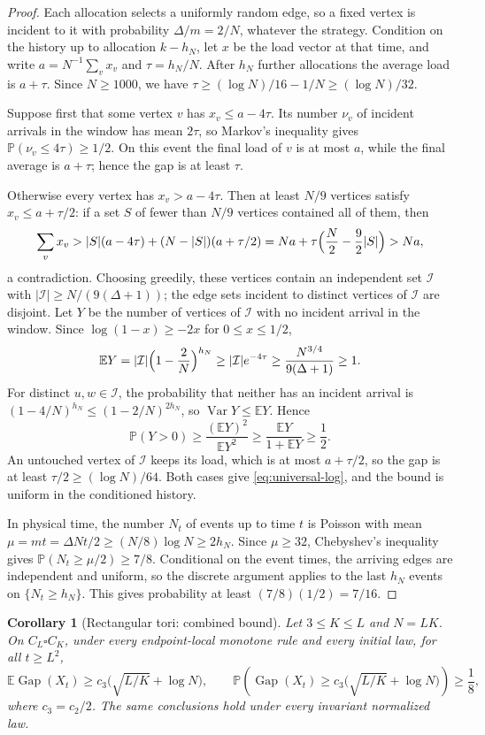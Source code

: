 \documentclass[11pt]{article}
\newtheorem{corollary}[corollary]{Corollary}
\theoremstyle{remark}
\newcommand{\E}{\mathbb{E}}
\newcommand{\Pp}{\mathbb{P}}
\newcommand{\Gap}{\operatorname{Gap}}
\newcommand{\Var}{\operatorname{Var}}
\begin{document}
\begin{proof}
Each allocation selects a uniformly random edge, so a fixed vertex is incident to it with probability $\Delta/m=2/N$, whatever the strategy. Condition on the history up to allocation $k-h_N$, let $x$ be the load vector at that time, and write $a=N^{-1}\sum_vx_v$ and $\tau=h_N/N$. After $h_N$ further allocations the average load is $a+\tau$. Since $N\ge1000$, we have $\tau\ge(\log N)/16-1/N\ge(\log N)/32$.

Suppose first that some vertex $v$ has $x_v\le a-4\tau$. Its number $\nu_v$ of incident arrivals in the window has mean $2\tau$, so Markov's inequality gives $\Pp(\nu_v\le4\tau)\ge1/2$. On this event the final load of $v$ is at most $a$, while the final average is $a+\tau$; hence the gap is at least $\tau$.

Otherwise every vertex has $x_v>a-4\tau$. Then at least $N/9$ vertices satisfy $x_v\le a+\tau/2$: if a set $S$ of fewer than $N/9$ vertices contained all of them, then
\[
 \sum_vx_v>|S|(a-4\tau)+(N-|S|)(a+\tau/2)=Na+\tau\Bigl(\frac N2-\frac92|S|\Bigr)>Na,
\]
a contradiction. Choosing greedily, these vertices contain an independent set $\mathcal I$ with $|\mathcal I|\ge N/(9(\Delta+1))$; the edge sets incident to distinct vertices of $\mathcal I$ are disjoint. Let $Y$ be the number of vertices of $\mathcal I$ with no incident arrival in the window. Since $\log(1-x)\ge-2x$ for $0\le x\le1/2$,
\[
 \E Y=|\mathcal I|\Bigl(1-\frac2N\Bigr)^{h_N}\ge |\mathcal I|e^{-4\tau}\ge\frac{N^{3/4}}{9(\Delta+1)}\ge1.
\]
For distinct $u,w\in\mathcal I$, the probability that neither has an incident arrival is $(1-4/N)^{h_N}\le(1-2/N)^{2h_N}$, so $\Var Y\le\E Y$. Hence
\[
 \Pp(Y>0)\ge\frac{(\E Y)^2}{\E Y^2}\ge\frac{\E Y}{1+\E Y}\ge\frac12.
\]
An untouched vertex of $\mathcal I$ keeps its load, which is at most $a+\tau/2$, so the gap is at least $\tau/2\ge(\log N)/64$. Both cases give \eqref{eq:universal-log}, and the bound is uniform in the conditioned history.

In physical time, the number $N_t$ of events up to time $t$ is Poisson with mean $\mu=mt=\Delta Nt/2\ge(N/8)\log N\ge2h_N$. Since $\mu\ge32$, Chebyshev's inequality gives $\Pp(N_t\ge\mu/2)\ge7/8$. Conditional on the event times, the arriving edges are independent and uniform, so the discrete argument applies to the last $h_N$ events on $\{N_t\ge h_N\}$. This gives probability at least $(7/8)(1/2)=7/16$.
\end{proof}

\begin{corollary}[Rectangular tori: combined bound]\label{cor:torus-combined}
Let $3\le K\le L$ and $N=LK$. On $C_L\square C_K$, under every endpoint-local monotone rule and every initial law, for all $t\ge L^2$,
\[
 \E\Gap(X_t)\ge c_3\bigl(\sqrt{L/K}+\log N\bigr),
 \qquad
 \Pp\!\left(\Gap(X_t)\ge c_3\bigl(\sqrt{L/K}+\log N\bigr)\right)\ge\frac18,
\]
where $c_3=c_2/2$. The same conclusions hold under every invariant normalized law.
\end{corollary}
\end{document}
